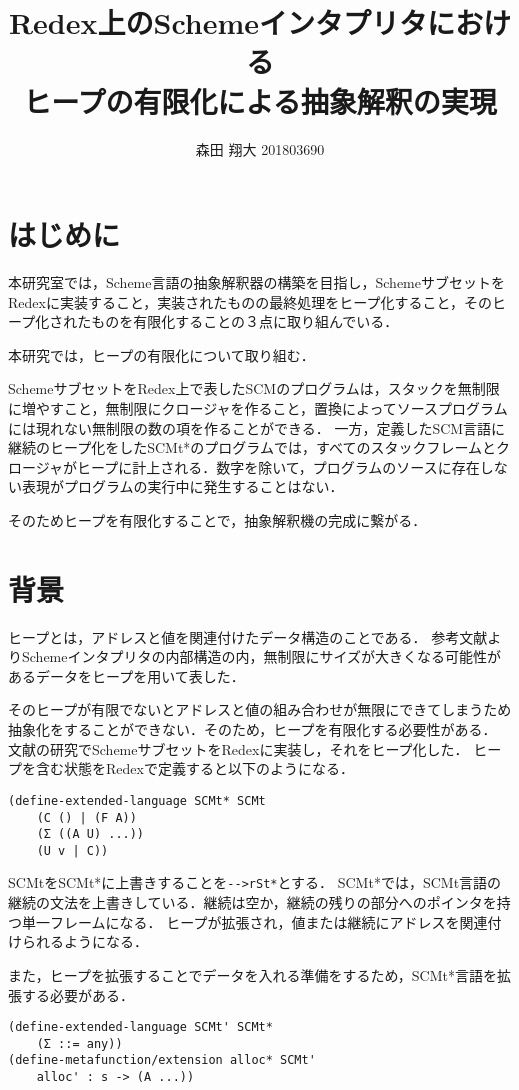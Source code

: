 \documentclass[twocolumn]{jsarticle}
\title{\textbf{Redex上のSchemeインタプリタにおける\\ヒープの有限化による抽象解釈の実現}}
\author{森田 翔大 201803690}
\date{} %
\begin{document}
\maketitle
\thispagestyle{fancy}

\section{はじめに}

本研究室では，Scheme言語の抽象解釈器の構築を目指し，SchemeサブセットをRedexに実装すること，実装されたものの最終処理をヒープ化すること，そのヒープ化されたものを有限化することの３点に取り組んでいる．

本研究では，ヒープの有限化について取り組む．

SchemeサブセットをRedex上で表したSCMのプログラム\cite{1}は，スタックを無制限に増やすこと，無制限にクロージャを作ること，置換によってソースプログラムには現れない無制限の数の項を作ることができる．
一方，定義したSCM言語に継続のヒープ化をしたSCMt*のプログラム\cite{2}では，すべてのスタックフレームとクロージャがヒープに計上される．数字を除いて，プログラムのソースに存在しない表現がプログラムの実行中に発生することはない．

そのためヒープを有限化することで，抽象解釈機の完成に繋がる．

\section{背景}

ヒープとは，アドレスと値を関連付けたデータ構造のことである．
参考文献\cite{2}よりSchemeインタプリタの内部構造の内，無制限にサイズが大きくなる可能性があるデータをヒープを用いて表した．

そのヒープが有限でないとアドレスと値の組み合わせが無限にできてしまうため抽象化をすることができない．そのため，ヒープを有限化する必要性がある．
文献\cite{1,2}の研究でSchemeサブセットをRedexに実装し，それをヒープ化した．
ヒープを含む状態をRedexで定義すると以下のようになる．

\begin{verbatim}
(define-extended-language SCMt* SCMt
    (C () | (F A))
    (Σ ((A U) ...))
    (U v | C))
\end{verbatim}
SCMtをSCMt*に上書きすることを\verb|-->rSt*|とする．
SCMt*では，SCMt言語の継続の文法を上書きしている．継続は空か，継続の残りの部分へのポインタを持つ単一フレームになる．
ヒープが拡張され，値または継続にアドレスを関連付けられるようになる．

また，ヒープを拡張することでデータを入れる準備をするため，SCMt*言語を拡張する必要がある．
\begin{verbatim}
(define-extended-language SCMt' SCMt*
    (Σ ::= any))
(define-metafunction/extension alloc* SCMt'
    alloc' : s -> (A ...))
\end{verbatim}
\end{document}
